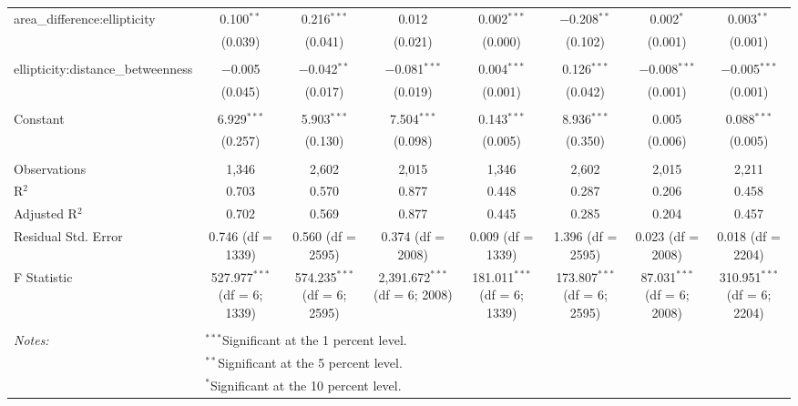 \begin{table}[!htbp]
\begin{tabular}{@{\extracolsep{5pt}}lccccccc}
 area\_difference:ellipticity & 0.100$^{**}$ & 0.216$^{***}$ & 0.012 & 0.002$^{***}$ & $-$0.208$^{**}$ & 0.002$^{*}$ & 0.003$^{**}$ \\ 
  & (0.039) & (0.041) & (0.021) & (0.000) & (0.102) & (0.001) & (0.001) \\ 
  & & & & & & & \\ 
 ellipticity:distance\_betweenness & $-$0.005 & $-$0.042$^{**}$ & $-$0.081$^{***}$ & 0.004$^{***}$ & 0.126$^{***}$ & $-$0.008$^{***}$ & $-$0.005$^{***}$ \\ 
  & (0.045) & (0.017) & (0.019) & (0.001) & (0.042) & (0.001) & (0.001) \\ 
  & & & & & & & \\ 
 Constant & 6.929$^{***}$ & 5.903$^{***}$ & 7.504$^{***}$ & 0.143$^{***}$ & 8.936$^{***}$ & 0.005 & 0.088$^{***}$ \\ 
  & (0.257) & (0.130) & (0.098) & (0.005) & (0.350) & (0.006) & (0.005) \\ 
  & & & & & & & \\ 
Observations & 1,346 & 2,602 & 2,015 & 1,346 & 2,602 & 2,015 & 2,211 \\ 
R$^{2}$ & 0.703 & 0.570 & 0.877 & 0.448 & 0.287 & 0.206 & 0.458 \\ 
Adjusted R$^{2}$ & 0.702 & 0.569 & 0.877 & 0.445 & 0.285 & 0.204 & 0.457 \\ 
Residual Std. Error & 0.746 (df = 1339) & 0.560 (df = 2595) & 0.374 (df = 2008) & 0.009 (df = 1339) & 1.396 (df = 2595) & 0.023 (df = 2008) & 0.018 (df = 2204) \\ 
F Statistic & 527.977$^{***}$ (df = 6; 1339) & 574.235$^{***}$ (df = 6; 2595) & 2,391.672$^{***}$ (df = 6; 2008) & 181.011$^{***}$ (df = 6; 1339) & 173.807$^{***}$ (df = 6; 2595) & 87.031$^{***}$ (df = 6; 2008) & 310.951$^{***}$ (df = 6; 2204) \\ 
\hline \\[-1.8ex] 
\textit{Notes:} & \multicolumn{7}{l}{$^{***}$Significant at the 1 percent level.} \\ 
 & \multicolumn{7}{l}{$^{**}$Significant at the 5 percent level.} \\ 
 & \multicolumn{7}{l}{$^{*}$Significant at the 10 percent level.} \\ 
\end{tabular} 
\end{table} 
